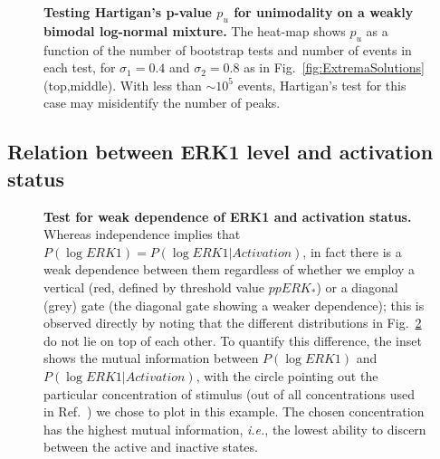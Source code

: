 \documentclass[11pt,a4paper,draft]{article}
\begin{document}
\begin{figure}[!ht]
 \centering
  \caption{\textbf{Testing Hartigan's p-value $p_u$ for unimodality on a weakly bimodal log-normal mixture.} The heat-map shows $p_u$ as a function of the number of bootstrap tests and number of events in each test, for $\sigma_1=0.4$ and $\sigma_2=0.8$ as in Fig.~\ref{fig:ExtremaSolutions}(top,middle). With less than $\sim10^5$ events, Hartigan's test for this case may misidentify the number of peaks.}
  \label{fig:CheckHartigan}
\end{figure}

\subsection*{Relation between ERK1 level and activation status}
\begin{figure}[!htb]
 \centering
  \caption{{\bf Test for weak dependence of ERK1 and activation status.} Whereas independence implies that $P(\log ERK1) = P(\log ERK1 \vert Activation)$, in fact there is a weak dependence between them regardless of whether we employ a vertical (red, defined by threshold value $ppERK_*$) or a diagonal (grey) gate (the diagonal gate showing a weaker dependence); this is observed directly by noting that the different distributions in Fig.~\ref{S1_Fig} do not lie on top of each other. To quantify this difference, the inset shows the mutual information between $P(\log ERK1)$ and $P(\log ERK1 | Activation)$, with the circle pointing out the particular concentration of stimulus (out of all concentrations used in Ref.~\cite{Feinerman2008}) we chose to plot in this example. The chosen concentration has the highest mutual information, {\it i.e.}, the lowest ability to discern between the active and inactive states.}
  \label{S1_Fig}
\end{figure}
\end{document}

